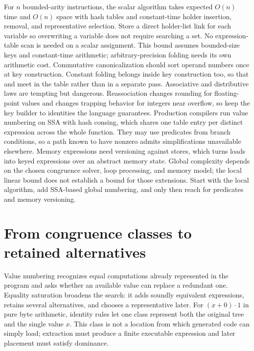 For $n$ bounded-arity instructions, the scalar algorithm takes expected $O(n)$ time and $O(n)$ space with hash tables and constant-time holder insertion, removal, and representative selection.
Store a direct holder-list link for each variable so overwriting a variable does not require searching a set.
No expression-table scan is needed on a scalar assignment.
This bound assumes bounded-size keys and constant-time arithmetic; arbitrary-precision folding needs its own arithmetic cost.
Commutative canonicalization should sort operand numbers once at key construction.
Constant folding belongs inside key construction too, so that  and  meet in the table rather than in a separate pass.
Associative and distributive laws are tempting but dangerous.
Reassociation changes rounding for floating-point values and changes trapping behavior for integers near overflow, so keep the key builder to identities the language guarantees.
Production compilers run value numbering on SSA with hash consing, which shares one table entry per distinct expression across the whole function.
They may use predicates from branch conditions, so a path known to have  nonzero admits simplifications unavailable elsewhere.
Memory expressions need versioning against stores, which turns loads into keyed expressions over an abstract memory state.
Global complexity depends on the chosen congruence solver, loop processing, and memory model; the local linear bound does not establish a bound for those extensions.
Start with the local algorithm, add SSA-based global numbering, and only then reach for predicates and memory versioning.

\section{From congruence classes to retained alternatives}
\label{sec:ch16-egraph-link}

Value numbering recognizes equal computations already represented in the program and asks whether an available value can replace a redundant one.
Equality saturation broadens the search: it adds soundly equivalent expressions, retains several alternatives, and chooses a representative later.
For $(x+0)\cdot1$ in pure byte arithmetic, identity rules let one class represent both the original tree and the single value $x$.
This class is not a location from which generated code can simply load; extraction must produce a finite executable expression and later placement must satisfy dominance.

